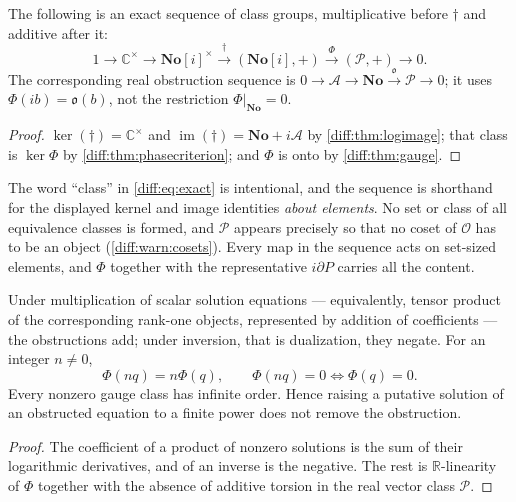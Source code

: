 \documentclass[11pt,letterpaper]{article}
\numberwithin{equation}{section}
\theoremstyle{definition}
\theoremstyle{remark}
\newcommand{\No}{\mathbf{No}}
\newcommand{\SC}{\mathbf{No}[i]}
\newcommand{\R}{\mathbb R}
\newcommand{\C}{\mathbb C}
\newcommand{\der}{\partial}
\newcommand{\Ofin}{\mathcal O}
\newcommand{\Pcl}{\mathcal P}
\newcommand{\Acl}{\mathcal A}
\newcommand{\Obs}{\mathfrak o}
\newcommand{\Ker}{\operatorname{ker}}
\begin{document}
\begin{corollary}
\label{diff:cor:exact}
The following is an exact sequence of class groups, multiplicative before
$\dagger$ and additive after it:
\begin{equation}\label{diff:eq:exact}
 1\longrightarrow\C^{\times}\longrightarrow\SC^{\times}
 \xrightarrow{\ \dagger\ }(\SC,+)
 \xrightarrow{\ \Phi\ }(\Pcl,+)\longrightarrow 0 .
\end{equation}
The corresponding real obstruction sequence is
$0\to\Acl\to\No\xrightarrow{\Obs}\Pcl\to 0$; it uses
$\Phi(ib)=\Obs(b)$, not the restriction $\Phi|_{\No}=0$.
\end{corollary}
\begin{proof}
$\Ker(\dagger)=\C^{\times}$ and $\operatorname{im}(\dagger)=\No+i\Acl$ by
\cref{diff:thm:logimage}; that class is $\Ker\Phi$ by
\cref{diff:thm:phasecriterion}; and $\Phi$ is onto by
\cref{diff:thm:gauge}.
\end{proof}

\begin{warning}
\label{diff:warn:elementwise}
The word ``class'' in \cref{diff:eq:exact} is intentional, and the sequence is
shorthand for the displayed kernel and image identities \emph{about elements}.
No set or class of all equivalence classes is formed, and $\Pcl$ appears
precisely so that no coset of $\Ofin$ has to be an object
(\cref{diff:warn:cosets}). Every map in the sequence acts on set-sized
elements, and $\Phi$ together with the representative $i\der P$ carries all the
content.
\end{warning}

\begin{corollary}
\label{diff:cor:tensor}
Under multiplication of scalar solution equations --- equivalently, tensor
product of the corresponding rank-one objects, represented by addition of
coefficients --- the obstructions add; under inversion, that is dualization,
they negate. For an integer $n\neq0$,
\[
 \Phi(nq)=n\Phi(q),\qquad \Phi(nq)=0\iff\Phi(q)=0 .
\]
Every nonzero gauge class has infinite order. Hence raising a putative solution
of an obstructed equation to a finite power does not remove the obstruction.
\end{corollary}
\begin{proof}
The coefficient of a product of nonzero solutions is the sum of their
logarithmic derivatives, and of an inverse is the negative. The rest is
$\R$-linearity of $\Phi$ together with the absence of additive torsion in the
real vector class $\Pcl$.
\end{proof}
\end{document}
